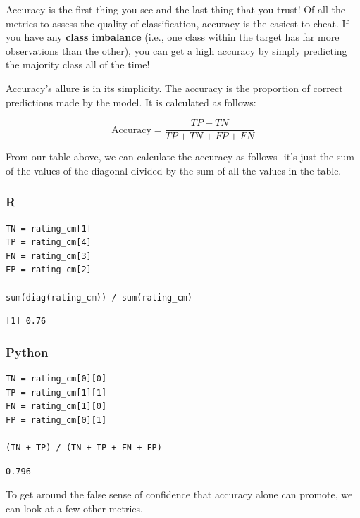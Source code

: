 \documentclass[
  letterpaper,
]{krantz}
\begin{document}
Accuracy is the first thing you see and the last thing that you trust!
Of all the metrics to assess the quality of classification, accuracy is
the easiest to cheat. If you have any \textbf{class imbalance} (i.e.,
one class within the target has far more observations than the other),
you can get a high accuracy by simply predicting the majority class all
of the time!

Accuracy's allure is in its simplicity. The accuracy is the proportion
of correct predictions made by the model. It is calculated as follows:

\[\text{Accuracy} = \frac{TP + TN}{TP + TN + FP + FN}\]

From our table above, we can calculate the accuracy as follows- it's
just the sum of the values of the diagonal divided by the sum of all the
values in the table.

\subsubsection{R}

\begin{verbatim}
TN = rating_cm[1]
TP = rating_cm[4]
FN = rating_cm[3]
FP = rating_cm[2]

sum(diag(rating_cm)) / sum(rating_cm)
\end{verbatim}

\begin{verbatim}
[1] 0.76
\end{verbatim}

\subsubsection{Python}

\begin{verbatim}
TN = rating_cm[0][0]
TP = rating_cm[1][1]
FN = rating_cm[1][0]
FP = rating_cm[0][1]

(TN + TP) / (TN + TP + FN + FP)
\end{verbatim}

\begin{verbatim}
0.796
\end{verbatim}

To get around the false sense of confidence that accuracy alone can
promote, we can look at a few other metrics.
\end{document}
